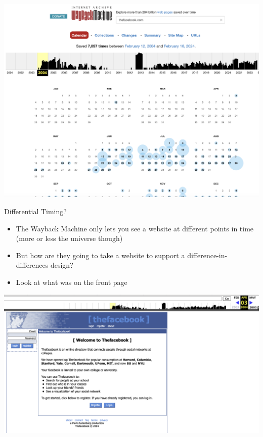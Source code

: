 \documentclass{beamer}
\begin{document}
\begin{frame}
\begin{center}
\includegraphics[scale=0.25]{./lecture_includes/wayback1}
\end{center}
\end{frame}

\begin{frame}{Differential Timing?}

\begin{itemize}

\item The Wayback Machine only lets you see a website at different points in time (more or less the universe though)
\item But how are they going to take a website to support a difference-in-differences design?
\item Look at what was on the front page 

\end{itemize}

\end{frame}

\begin{frame}
\begin{center}
\includegraphics[scale=0.35]{./lecture_includes/wayback2}
\end{center}
\end{frame}
\end{document}
